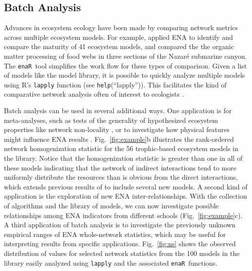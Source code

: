 \documentclass[11pt]{article}
\newcommand{\enaR}{\texttt{enaR}}
\begin{document}
\begin{spacing}{2}
\subsection{Batch Analysis}
Advances in ecosystem ecology have been made by comparing network
metrics across multiple ecosystem models. For example,
\citet{christensen95} applied ENA to identify and compare the maturity
of 41 ecosystem models, and \citet{vanoevelen2011canyon} compared the
the organic matter processing of food webs in three sections of the
Nazar{\'e} submarine canyon.  The \enaR\ tool simplifies the work flow
for these types of comparison. Given a list of models like the model
library, it is possible to quickly analyze multiple models using R's
\texttt{lapply} function (see \texttt{help}(``lapply'')).  This
facilitates the kind of comparative network analysis often of interest
to ecologists \citep{monaco97,christian05_cnea, whipple07}.

Batch analysis can be used in several additional ways.  One
application is for meta-analyses, such as tests of the generality of
hypothesized ecosystem properties like network non-locality
\citep{salas11_did}, %
or to investigate how physical features might influence ENA results
\citep{niquil2012physical}. Fig.~\ref{fig:example}b illustrates the
rank-ordered network homogenization statistic for the 56 trophic-based
ecosystem models in the library. Notice that the homogenization
statistic is greater than one in all of these models indicating that
the network of indirect interactions tend to more uniformly distribute
the resources than is obvious from the direct interactions, which
extends previous results of \citet{borrett10_hmg} to include several
new models.  A second kind of application is the exploration of new
ENA inter-relationships.  With the collection of algorithms and the
library of models, we can now investigate possible relationships among
ENA indicators from different schools (Fig.~\ref{fig:example}c).  A
third application of batch analysis is to investigate the previously
unknown empirical ranges of ENA whole-network statistics, which may be
useful for interpreting results from specific applications.
Fig.~\ref{fig:ns} shows the observed distribution of values for
selected network statistics from the 100 models in the library easily
analyzed using \texttt{lapply} and the associated \enaR\ functions.


\end{spacing}
\end{document}
